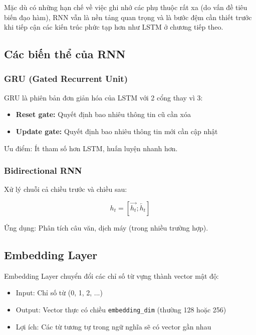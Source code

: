 Mặc dù có những hạn chế về việc ghi nhớ các phụ thuộc rất xa (do vấn đề tiêu biến đạo hàm), RNN vẫn là nền tảng quan trọng và là bước đệm cần thiết trước khi tiếp cận các kiến trúc phức tạp hơn như LSTM ở chương tiếp theo.

\subsection{Các biến thể của RNN}

\subsubsection{GRU (Gated Recurrent Unit)}

GRU là phiên bản đơn giản hóa của LSTM với 2 cổng thay vì 3:

\begin{itemize}
    \item \textbf{Reset gate:} Quyết định bao nhiêu thông tin cũ cần xóa
    \item \textbf{Update gate:} Quyết định bao nhiêu thông tin mới cần cập nhật
\end{itemize}

Ưu điểm: Ít tham số hơn LSTM, huấn luyện nhanh hơn.

\subsubsection{Bidirectional RNN}

Xử lý chuỗi cả chiều trước và chiều sau:

\begin{equation}
    h_t = [\overrightarrow{h_t}; \overleftarrow{h_t}]
\end{equation}

Ứng dụng: Phân tích câu văn, dịch máy (trong nhiều trường hợp).

\subsection{Embedding Layer}

Embedding Layer chuyển đổi các chỉ số từ vựng thành vector mật độ:

\begin{itemize}
    \item Input: Chỉ số từ (0, 1, 2, ...)
    \item Output: Vector thực có chiều \texttt{embedding\_dim} (thường 128 hoặc 256)
    \item Lợi ích: Các từ tương tự trong ngữ nghĩa sẽ có vector gần nhau
\end{itemize}

